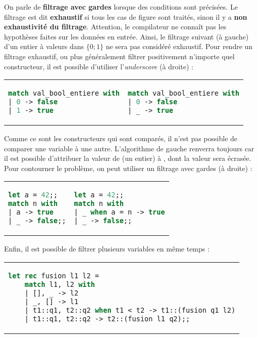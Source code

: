 \documentclass{hibiscus}
\begin{document}
\bigskip \par On parle de \textbf{filtrage avec gardes} lorsque des conditions sont précisées. Le filtrage est dit \textbf{exhaustif} si tous les cas de figure sont traités, sinon il y a \textbf{non exhaustivité du filtrage}. Attention, le compilateur ne connaît pas les hypothèses faites sur les données en entrée. Ainsi, le filtrage suivant (à gauche) d'un entier à valeurs dans $\{0; 1\}$ ne sera pas considéré exhaustif. Pour rendre un filtrage exhaustif, ou plus généralement filtrer positivement n'importe quel constructeur, il est possible d'utiliser l'\textit{underscore} (à droite) :

\begin{tabular}{p{} p{}}
\begin{lstlisting}[language=Caml]
match val_bool_entiere with
| 0 -> false
| 1 -> true
\end{lstlisting}
&
\begin{lstlisting}[language=Caml]
match val_bool_entiere with
| 0 -> false
| _ -> true
\end{lstlisting}
\end{tabular}

\par Comme ce sont les constructeurs qui sont comparés, il n'est pas possible de comparer une variable à une autre. L'algorithme de gauche renverra toujours  car il est possible d'attribuer la valeur de  (un entier) à , dont la valeur sera écrasée. Pour contourner le problème, on peut utiliser un filtrage avec gardes (à droite) :

\begin{tabular}{p{} p{}}
\begin{lstlisting}[language=Caml]
let a = 42;;
match n with
| a -> true
| _ -> false;;
\end{lstlisting}
&
\begin{lstlisting}[language=Caml]
let a = 42;;
match n with
| _ when a = n -> true
| _ -> false;;
\end{lstlisting}
\end{tabular}

\par Enfin, il est possible de filtrer plusieurs variables en même temps :

\medskip \begin{tabular}{l}
\begin{lstlisting}[language=Caml]
let rec fusion l1 l2 =
    match l1, l2 with
    | [], _ -> l2
    | _, [] -> l1
    | t1::q1, t2::q2 when t1 < t2 -> t1::(fusion q1 l2)
    | t1::q1, t2::q2 -> t2::(fusion l1 q2);;
\end{lstlisting}
\end{tabular}
\end{document}

